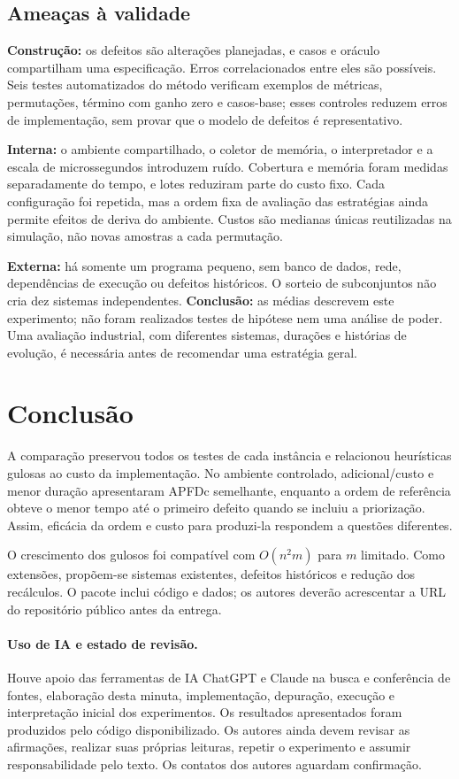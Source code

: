 \documentclass[12pt]{article}
\begin{document}
\subsection{Ameaças à validade}
\textbf{Construção:} os defeitos são alterações planejadas, e casos e oráculo compartilham uma especificação. Erros correlacionados entre eles são possíveis. Seis testes automatizados do método verificam exemplos de métricas, permutações, término com ganho zero e casos-base; esses controles reduzem erros de implementação, sem provar que o modelo de defeitos é representativo.

\textbf{Interna:} o ambiente compartilhado, o coletor de memória, o interpretador e a escala de microssegundos introduzem ruído. Cobertura e memória foram medidas separadamente do tempo, e lotes reduziram parte do custo fixo. Cada configuração foi repetida, mas a ordem fixa de avaliação das estratégias ainda permite efeitos de deriva do ambiente. Custos são medianas únicas reutilizadas na simulação, não novas amostras a cada permutação.

\textbf{Externa:} há somente um programa pequeno, sem banco de dados, rede, dependências de execução ou defeitos históricos. O sorteio de subconjuntos não cria dez sistemas independentes. \textbf{Conclusão:} as médias descrevem este experimento; não foram realizados testes de hipótese nem uma análise de poder. Uma avaliação industrial, com diferentes sistemas, durações e histórias de evolução, é necessária antes de recomendar uma estratégia geral.
\section{Conclusão}
A comparação preservou todos os testes de cada instância e relacionou heurísticas gulosas ao custo da implementação. No ambiente controlado, adicional/custo e menor duração apresentaram APFDc semelhante, enquanto a ordem de referência obteve o menor tempo até o primeiro defeito quando se incluiu a priorização. Assim, eficácia da ordem e custo para produzi-la respondem a questões diferentes.

O crescimento dos gulosos foi compatível com $O(n^2m)$ para $m$ limitado. Como extensões, propõem-se sistemas existentes, defeitos históricos e redução dos recálculos. O pacote inclui código e dados; os autores deverão acrescentar a URL do repositório público antes da entrega.

\paragraph{Uso de IA e estado de revisão.} Houve apoio das ferramentas de IA ChatGPT e Claude na busca e conferência de fontes, elaboração desta minuta, implementação, depuração, execução e interpretação inicial dos experimentos. Os resultados apresentados foram produzidos pelo código disponibilizado. Os autores ainda devem revisar as afirmações, realizar suas próprias leituras, repetir o experimento e assumir responsabilidade pelo texto. Os contatos dos autores aguardam confirmação.


\end{document}
